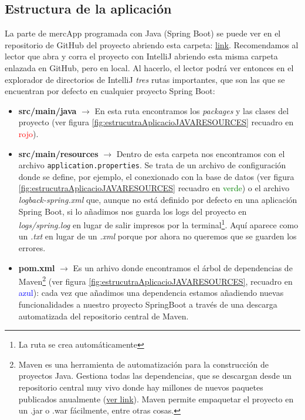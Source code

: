 \documentclass[a4paper,12pt]{report}
\begin{document}
				\subsection{Estructura de la aplicación}
				\label{sec:estructuraAplicacion}
				
				La parte de mercApp programada con Java (Spring Boot) se puede ver en el repositorio de GitHub del proyecto abriendo esta carpeta: \href{https://github.com/blackcub3s/mercApp/tree/main/APP%20WEB/__springboot__produccio__/app}{link}. Recomendamos al lector que abra y corra el proyecto con IntelliJ abriendo esta misma carpeta enlazada en GitHub, pero en local. Al hacerlo, el lector podrá ver entonces en el explorador de directorios de IntelliJ \textit{tres} rutas importantes, que son las que se encuentran por defecto en cualquier proyecto Spring Boot:
				
				\vspace{-.9em}
				\begin{itemize}
					\setlength{\itemsep}{-.5em}
					\item \textbf{src/main/java} $\rightarrow$ En esta ruta encontramos los \textit{packages} y las clases del proyecto (ver figura \ref{fig:estrucutraAplicacioJAVARESOURCES} recuadro en \textcolor{red}{rojo}).
					\item \textbf{src/main/resources} $\rightarrow$ Dentro de esta carpeta  nos encontramos con el archivo \texttt{application.properties}. Se trata de un archivo de configuración donde se define, por ejemplo, el conexionado con la base de datos (ver figura \ref{fig:estrucutraAplicacioJAVARESOURCES} recuadro en \textcolor{green}{verde}) o el archivo \textit{logback-spring.xml} que, aunque no está definido por defecto en una aplicación Spring Boot, si lo añadimos nos guarda los logs del proyecto en \textit{logs/spring.log} en lugar de salir impresos por la terminal\footnote{La ruta se crea automáticamente}. Aquí aparece como un \textit{.txt} en lugar de un \textit{.xml} porque por ahora no queremos que se guarden los errores.
					\item \textbf{pom.xml} $\rightarrow$ Es un arhivo donde encontramos el árbol de dependencias de Maven\footnote{Maven es una herramienta de automatización para la construcción de proyectos Java. Gestiona todas las dependencias, que se descargan desde un repositorio central muy vivo donde hay millones de nuevos paquetes publicados anualmente (\href{https://mvnrepository.com/repos/central}{ver link}). Maven permite empaquetar el proyecto en un .jar o .war fácilmente, entre otras cosas.} (ver figura \ref{fig:estrucutraAplicacioJAVARESOURCES}, recuadro en \textcolor{blue}{azul}): cada vez que añadimos una dependencia estamos añadiendo nuevas funcionalidades a nuestro proyecto SpringBoot a través de una descarga automatizada del repositorio central de Maven.
					
					
				\end{itemize}
				
\end{document}
